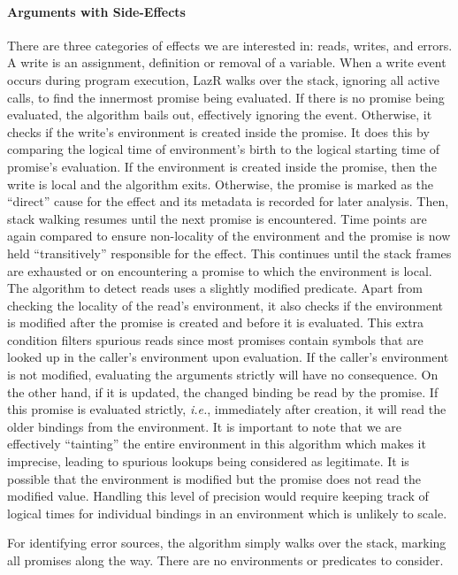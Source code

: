 \documentclass[review,nonacm,screen,acmsmall,anonymous=true]{acmart}
\newcommand{\lazr}{{\sf LazR}\xspace}
\begin{document}
\paragraph{Arguments with Side-Effects}

There are three categories of effects we are interested in: reads, writes, and
errors.
A write is an
assignment, definition or removal of a variable. When a write event occurs
during program execution, \lazr walks over the stack, ignoring all active calls,
to find the innermost promise being evaluated. If there is no promise being
evaluated, the algorithm bails out, effectively ignoring the event. Otherwise,
it checks if the write's environment is created inside the promise. It does this
by comparing the logical time of environment's birth to the logical starting
time of promise's evaluation. If the environment is created inside the promise,
then the write is local and the algorithm exits. Otherwise, the promise is
marked as the ``direct'' cause for the effect and its metadata is recorded for
later analysis. Then, stack walking resumes until the next promise is
encountered. Time points are again compared to ensure non-locality of the
environment and the promise is now held ``transitively'' responsible for the
effect. This continues until the stack frames are exhausted or on encountering a
promise to which the environment is local. The algorithm to detect reads uses a
slightly modified predicate. Apart from checking the locality of the read's
environment, it also checks if the environment is modified after the promise is
created and before it is evaluated. This extra condition filters spurious reads
since most promises contain symbols that are looked up in the caller's
environment upon evaluation. If the caller's environment is not modified,
evaluating the arguments strictly will have no consequence. On the other hand,
if it is updated, the changed binding be read by the promise. If this promise is
evaluated strictly, \textit{i.e.}, immediately after creation, it will read the
older bindings from the environment. It is important to note that we are
effectively ``tainting'' the entire environment in this algorithm which makes it
imprecise, leading to spurious lookups being considered as legitimate. It is
possible that the environment is modified but the promise does not read the
modified value. Handling this level of precision would require keeping track of
logical times for individual bindings in an environment which is unlikely to
scale.

For identifying error sources, the algorithm simply walks over the stack,
marking all promises along the way. There are no environments or predicates to
consider.
\end{document}
